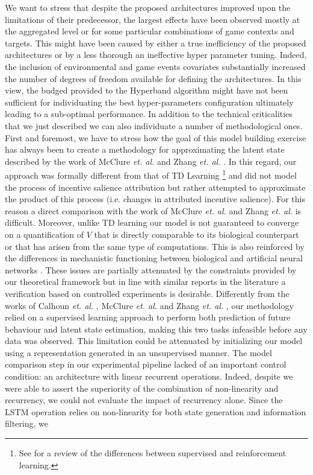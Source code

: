 We want to stress that despite the proposed architectures improved upon the limitations of their predecessor, the largest effects have been observed mostly at the aggregated level or for some particular combinations of game contexts and targets. This might have been caused by either a true inefficiency of the proposed architectures or by a less thorough an ineffective hyper parameter tuning. Indeed, the inclusion of environmental and game events covariates substantially increased the number of degrees of freedom available for defining the architectures. In this view, the budged provided to the Hyperband algorithm might have not been sufficient for individuating the best hyper-parameters configuration ultimately leading to a sub-optimal performance. In addition to the technical criticalities that we just described we can also individuate a number of methodological ones. First and foremost, we have to stress how the goal of this model building exercise has always been to create a methodology for approximating the latent state described by the work of McClure \textit{et. al.} \cite{mcclure2003computational} and Zhang \textit{et. al.} \cite{zhang2009neural}. In this regard, our approach was formally different from that of TD Learning \footnote{See \cite{barto2004reinforcement} for a  review of the differences between supervised and reinforcement learning.} and did not model the process of incentive salience attribution but rather attempted to approximate the product of this process (i.e. changes in attributed incentive salience). For this reason a direct comparison with the work of McClure \textit{et. al.} \cite{mcclure2003computational} and Zhang \textit{et. al.} \cite{zhang2009neural} is difficult. Moreover, unlike TD learning \cite{schultz1997neural} our model is not guaranteed to converge on a quantification of $V$ that is directly comparable to its biological counterpart or that has arisen from the same type of computations. This is also reinforced by the differences in mechanistic functioning between biological and artificial neural networks \cite{lillicrap2019backpropagation,lillicrap2020backpropagation}. These issues are partially attenuated by the constraints provided by our theoretical framework but in line with similar reports in the literature \cite{calhoun2019unsupervised,wang2018prefrontal} a verification based on controlled experiments is desirable. Differently from the works of Calhoun \textit{et. al.} \cite{calhoun2019unsupervised},  McClure \textit{et. al.} \cite{mcclure2003computational} and Zhang \textit{et. al.} \cite{zhang2009neural}, our methodology relied on a  supervised learning approach to perform both prediction of future behaviour and latent state estimation, making this two tasks infeasible before any data was observed. This limitation could be attenuated by initializing our model using a representation  generated in an unsupervised manner. The model comparison step in our experimental pipeline lacked of an important control condition: an architecture with linear recurrent operations. Indeed, despite we were able to assert the superiority of the combination of non-linearity and recurrency, we could not evaluate the impact of recurrency alone. Since the LSTM operation relies on non-linearity for both state generation and information filtering, we 